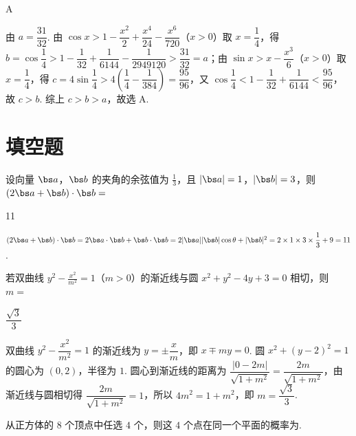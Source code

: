 \begin{answer}
A
\end{answer}

\begin{solution}
由 \(a=\dfrac{31}{32}\). 由 \(\cos x>1-\dfrac{x^2}{2}+\dfrac{x^4}{24}-\dfrac{x^6}{720}\)（\(x>0\)）取 \(x=\dfrac14\)，得 \(b=\cos\dfrac14>1-\dfrac1{32}+\dfrac1{6144}-\dfrac1{2949120}>\dfrac{31}{32}=a\)；由 \(\sin x>x-\dfrac{x^3}{6}\)（\(x>0\)）取 \(x=\dfrac14\)，得 \(c=4\sin\dfrac14>4\left(\dfrac14-\dfrac1{384}\right)=\dfrac{95}{96}\)，又 \(\cos\dfrac14<1-\dfrac1{32}+\dfrac1{6144}<\dfrac{95}{96}\)，故 \(c>b\). 综上 \(c>b>a\)，故选 A.
\end{solution}

\section{填空题}

\begin{problem}
设向量 \(\bs a\)，\(\bs b\) 的夹角的余弦值为 \(\frac13\)，且 \(|\bs a|=1\)，\(|\bs b|=3\)，则 \((2\bs a+\bs b)\cdot\bs b=\)\fillinblank{}
\end{problem}

\begin{answer}
11
\end{answer}

\begin{solution}
\((2\bs a+\bs b)\cdot\bs b=2\bs a\cdot\bs b+\bs b\cdot\bs b=2|\bs a||\bs b|\cos\theta+|\bs b|^2=2\times1\times3\times\dfrac13+9=11\).
\end{solution}

\begin{problem}
若双曲线 \(y^2-\frac{x^2}{m^2}=1\)（\(m>0\)）的渐近线与圆 \(x^2+y^2-4y+3=0\) 相切，则 \(m=\)\fillinblank{}
\end{problem}

\begin{answer}
\(\dfrac{\sqrt3}{3}\)
\end{answer}

\begin{solution}
双曲线 \(y^2-\dfrac{x^2}{m^2}=1\) 的渐近线为 \(y=\pm\dfrac xm\)，即 \(x\mp my=0\). 圆 \(x^2+(y-2)^2=1\) 的圆心为 \((0,2)\)，半径为 \(1\). 圆心到渐近线的距离为 \(\dfrac{|0-2m|}{\sqrt{1+m^2}}=\dfrac{2m}{\sqrt{1+m^2}}\)，由渐近线与圆相切得 \(\dfrac{2m}{\sqrt{1+m^2}}=1\)，所以 \(4m^2=1+m^2\)，即 \(m=\dfrac{\sqrt3}{3}\).
\end{solution}

\begin{problem}
从正方体的 \(8\) 个顶点中任选 \(4\) 个，则这 \(4\) 个点在同一个平面的概率为\fillinblank{}.
\end{problem}

